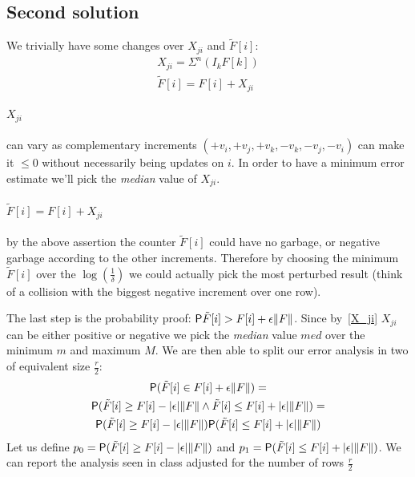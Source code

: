
\subsection{Second solution}

We trivially have some changes over $X_{ji}$ and $\tilde{F}[i]$:
    \begin{gather*}
        X_{ji} = \Sigma^{n}(I_k F[k]) \\
        \tilde{F}[i] = F[i] + X_{ji}
    \end{gather*}
\label{X_ji}\paragraph{$X_{ji}$} can vary as complementary increments $(+v_i, +v_j, +v_k, -v_k, -v_j, -v_i)$
can make it $\leq 0$ without necessarily being updates on $i$.
In order to have a minimum error estimate we'll pick the \emph{median} value of $X_{ji}$.
\label{f_tilde}~\paragraph{$\tilde{F}[i] = F[i] + X_{ji}$} by the above assertion the counter $\tilde{F}[i]$ could have no garbage, or negative
garbage according to the other increments.
Therefore by choosing the minimum $\tilde{F}[i]$ over the $\log(\frac{1}{\delta})$ we
could actually pick the most perturbed result (think of a collision with the
biggest negative increment over one row).

\label{probability}The last step is the probability proof: $\mathsf{P}{\tilde{F}[i] > F[i] + \epsilon \lVert F\rVert}$.
Since by~\ref{X_ji} $X_{ji}$ can be either positive or negative we pick the \emph{median}
value $med$ over the minimum $m$ and maximum $M$.
We are then able to split our error analysis in two of equivalent size $\frac{r}{2}$:
\begin{gather*}
\mathsf{P}(\tilde{F}[i] \in F[i] + \epsilon \lVert F\rVert) = \\
\mathsf{P}(\tilde{F}[i] \geq F[i] - \lvert\epsilon\rvert \lVert F\rVert \wedge \tilde{F}[i] \leq F[i] + \lvert\epsilon\rvert \lVert F\rVert) = \\
\mathsf{P}(\tilde{F}[i] \geq F[i] - \lvert\epsilon\rvert \lVert F\rVert) \mathsf{P}(\tilde{F}[i] \leq F[i] + \lvert\epsilon\rvert \lVert F\rVert)
\end{gather*}
Let us define $p_0 = \mathsf{P}(\tilde{F}[i] \geq F[i] - \lvert\epsilon\rvert \lVert F\rVert)$ and
$p_1 = \mathsf{P}(\tilde{F}[i] \leq F[i] + \lvert\epsilon\rvert \lVert F\rVert)$.
We can report the analysis seen in class adjusted for the number of rows $\frac{r}{2}$

